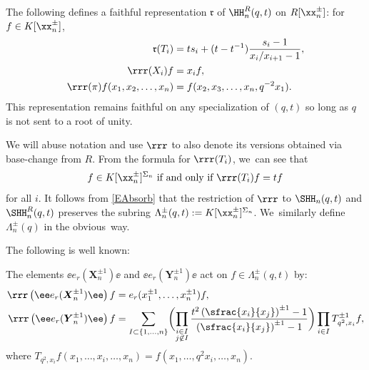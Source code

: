 \begin{thm}
The following defines a faithful representation $\mathfrak{r}$ of $\HH_{n}^R(q,t)$ on $R[\xx_n^\pm]$: for $f\in K[\xx_n^\pm]$,
\begin{align*}
\mathfrak{r}(T_i)&=ts_i+(t-t^{-1})\frac{s_i-1}{x_i/x_{i+1}-1},\\
\rrr(X_i)f&=x_if,\\
\rrr(\pi)f(x_1,x_2,\ldots, x_n)&=f(x_2,x_3,\ldots, x_n, q^{-2}x_1).
\end{align*}
This representation remains faithful on any specialization of $(q,t)$ so long as $q$ is not sent to a root of unity.
\end{thm}

We will abuse notation and use $\rrr$ to also denote its versions obtained via base-change from $R$.
From the formula for $\rrr(T_i)$, we~can see that
\[
f\in K[\xx_n^\pm]^{\Sigma_n}\hbox{ if and only if }\rrr(T_i)f=tf
\]
for all $i$.
It follows from \eqref{EAbsorb} that the restriction of $\rrr$ to $\SHH_{n}(q,t)$ and $\SHH_n^R(q,t)$ preserves the subring $\Lambda_n^\pm(q,t):=K[\xx_n^\pm]^{\Sigma_n}$. We~similarly define $\Lambda_n^\pm(q)$ in the obvious~way.

The following is well known:
\begin{prop}\label{MacGen}
The elements $\ee e_r(\boldsymbol{X}_n^{\pm 1})\ee$ and $\ee e_r(\boldsymbol{Y}_n^{\pm 1})\ee$ act on $f\in\Lambda^\pm_n(q,t)$ by:
\begin{align*}
\rrr\left(\ee e_r(\boldsymbol{X}_n^{\pm 1})\ee\right) f&=e_r(x_1^{\pm 1},\ldots, x_n^{\pm 1})f,\\
\rrr\left(\ee e_r(\boldsymbol{Y}_n^{\pm 1})\ee\right) f&=\sum_{I\subset\{1,\ldots, n\}}\biggl(\prod_{\substack{i\in I\\ j\not\in I}}\frac{t^2\left(\sfrac{x_i}{x_j}\right)^{\pm 1}-1}{\left(\sfrac{x_i}{x_j}\right)^{\pm 1}-1}\biggr)\prod_{i\in I}T_{q^2, x_i}^{\pm 1} f,
\end{align*}
where $T_{q^2, x_i}f(x_1,\ldots, x_i,\ldots,x_n)=f(x_1,\ldots, q^2x_i,\ldots, x_n)$.
\end{prop}

